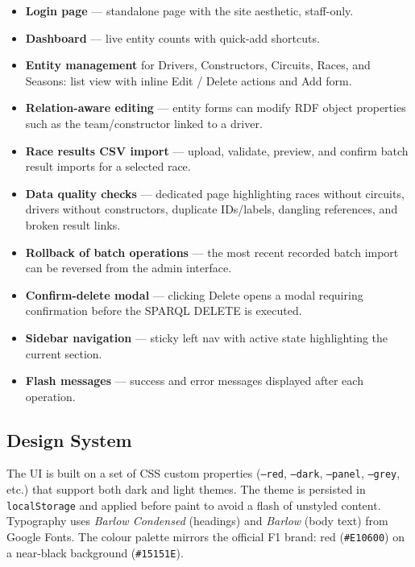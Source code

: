 \documentclass[12pt,a4paper]{article}
\begin{document}
\begin{itemize}[leftmargin=1.5em]
  \item \textbf{Login page} --- standalone page with the site aesthetic, staff-only.
  \item \textbf{Dashboard} --- live entity counts with quick-add shortcuts.
  \item \textbf{Entity management} for Drivers, Constructors, Circuits, Races,
        and Seasons: list view with inline Edit / Delete actions and Add form.
  \item \textbf{Relation-aware editing} --- entity forms can modify RDF object
        properties such as the team/constructor linked to a driver.
  \item \textbf{Race results CSV import} --- upload, validate, preview, and
        confirm batch result imports for a selected race.
  \item \textbf{Data quality checks} --- dedicated page highlighting races
        without circuits, drivers without constructors, duplicate IDs/labels,
        dangling references, and broken result links.
  \item \textbf{Rollback of batch operations} --- the most recent recorded
        batch import can be reversed from the admin interface.
  \item \textbf{Confirm-delete modal} --- clicking Delete opens a modal
        requiring confirmation before the SPARQL DELETE is executed.
  \item \textbf{Sidebar navigation} --- sticky left nav with active state
        highlighting the current section.
  \item \textbf{Flash messages} --- success and error messages displayed after
        each operation.
\end{itemize}

\subsection{Design System}

The UI is built on a set of CSS custom properties (\texttt{--red},
\texttt{--dark}, \texttt{--panel}, \texttt{--grey}, etc.) that support both
dark and light themes. The theme is persisted in \texttt{localStorage} and
applied before paint to avoid a flash of unstyled content. Typography uses
\emph{Barlow Condensed} (headings) and \emph{Barlow} (body text) from Google
Fonts. The colour palette mirrors the official F1 brand: red (\texttt{\#E10600})
on a near-black background (\texttt{\#15151E}).
\end{document}
